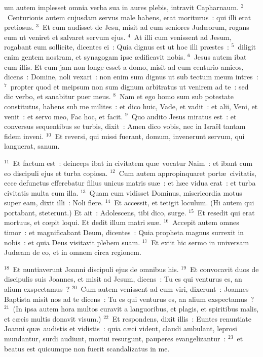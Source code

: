 \bchapter
{}um autem implesset omnia verba sua in aures plebis, intravit Capharnaum.
${}^{2}$~Centurionis autem cujusdam servus male habens, erat moriturus~: qui illi erat pretiosus.
${}^{3}$~Et cum audisset de Jesu, misit ad eum seniores Jud\ae orum, rogans eum ut veniret et salvaret servum ejus.
${}^{4}$~At illi cum venissent ad Jesum, rogabant eum sollicite, dicentes ei~: Quia dignus est ut hoc illi pr\ae stes~:
${}^{5}$~diligit enim gentem nostram, et synagogam ipse \ae dificavit nobis.
${}^{6}$~Jesus autem ibat cum illis. Et cum jam non longe esset a domo, misit ad eum centurio amicos, dicens~: Domine, noli vexari~: non enim sum dignus ut sub tectum meum intres~:
${}^{7}$~propter quod et meipsum non sum dignum arbitratus ut venirem ad te~: sed dic verbo, et sanabitur puer meus.
${}^{8}$~Nam et ego homo sum sub potestate constitutus, habens sub me milites~: et dico huic, Vade, et vadit~: et alii, Veni, et venit~: et servo meo, Fac hoc, et facit.
${}^{9}$~Quo audito Jesus miratus est~: et conversus sequentibus se turbis, dixit~: Amen dico vobis, nec in Isra\"el tantam fidem inveni.
${}^{10}$~Et reversi, qui missi fuerant, domum, invenerunt servum, qui languerat, sanum.


${}^{11}$~Et factum est~: deinceps ibat in civitatem qu\ae\ vocatur Naim~: et ibant cum eo discipuli ejus et turba copiosa.
${}^{12}$~Cum autem appropinquaret port\ae\ civitatis, ecce defunctus efferebatur filius unicus matris su\ae~: et h\ae c vidua erat~: et turba civitatis multa cum illa.
${}^{13}$~Quam cum vidisset Dominus, misericordia motus super eam, dixit illi~: Noli flere.
${}^{14}$~Et accessit, et tetigit loculum. (Hi autem qui portabant, steterunt.) Et ait~: Adolescens, tibi dico, surge.
${}^{15}$~Et resedit qui erat mortuus, et cœpit loqui. Et dedit illum matri su\ae .
${}^{16}$~Accepit autem omnes timor~: et magnificabant Deum, dicentes~: Quia propheta magnus surrexit in nobis~: et quia Deus visitavit plebem suam.
${}^{17}$~Et exiit hic sermo in universam Jud\ae am de eo, et in omnem circa regionem.


${}^{18}$~Et nuntiaverunt Joanni discipuli ejus de omnibus his.
${}^{19}$~Et convocavit duos de discipulis suis Joannes, et misit ad Jesum, dicens~: Tu es qui venturus es, an alium exspectamus~?
${}^{20}$~Cum autem venissent ad eum viri, dixerunt~: Joannes Baptista misit nos ad te dicens~: Tu es qui venturus es, an alium exspectamus~?
${}^{21}$~(In ipsa autem hora multos curavit a languoribus, et plagis, et spiritibus malis, et c\ae cis multis donavit visum.)
${}^{22}$~Et respondens, dixit illis~: Euntes renuntiate Joanni qu\ae\ audistis et vidistis~: quia c\ae ci vident, claudi ambulant, leprosi mundantur, surdi audiunt, mortui resurgunt, pauperes evangelizantur~:
${}^{23}$~et beatus est quicumque non fuerit scandalizatus in me.


